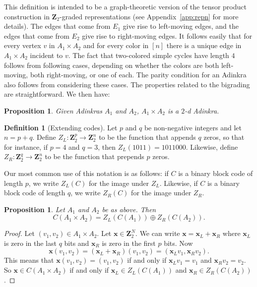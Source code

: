 \documentclass[12pt,twoside,singlespace]{article}
\numberwithin{equation}{section}
\newtheorem{prop}[equation]{Proposition}
\theoremstyle{definition}
\newtheorem{definition}[equation]{Definition}
\newcommand{\ZZ}{\mathbf{Z}}
\renewcommand{\vec}[1]{\mathbf{#1}}
\begin{document}
This definition is intended to be a graph-theoretic version of the tensor product construction in $\ZZ_2$-graded representations (see Appendix~\ref{app:repn} for more details).  The edges that come from $E_1$ give rise to left-moving edges, and the edges that come from $E_2$ give rise to right-moving edges.  It follows easily that for every vertex $v$ in $A_1\times A_2$ and for every color in $[n]$ there is a unique edge in $A_1\times A_2$ incident to $v$.  The fact that two-colored simple cycles have length $4$ follows from following cases, depending on whether the colors are both left-moving, both right-moving, or one of each.  The parity condition for an Adinkra also follows from considering these cases.  The properties related to the bigrading are straightforward.  We then have:

\begin{prop}
\label{prop:product-admissible}
Given Adinkras $A_1$ and $A_2$, $A_1\times A_2$ is a $2$-d Adinkra.
\end{prop}


\begin{definition}[Extending codes]
Let $p$ and $q$ be non-negative integers and let $n=p+q$.  Define $Z_L:\ZZ_2^p\to\ZZ_2^n$ to be the function that appends $q$ zeros, so that for instance, if $p=4$ and $q=3$, then $Z_L(1011)=1011000$.  Likewise, define $Z_R:\ZZ_2^q\to\ZZ_2^n$ to be the function that prepends $p$ zeros.

Our most common use of this notation is as follows: if $C$ is a binary block code of length $p$, we write $Z_L(C)$ for the image under $Z_L$.  Likewise, if $C$ is a binary block code of length $q$, we write $Z_R(C)$ for the image under $Z_R$.
\end{definition}

\begin{prop}
\label{prop:prodcode}
Let $A_1$ and $A_2$ be as above.  Then
\[C(A_1\times A_2)=Z_L(C(A_1))\oplus Z_R(C(A_2)).\]
\end{prop}
\begin{proof}
Let $(v_1,v_2)\in A_1\times A_2$.  Let $\vec{x}\in \ZZ_2^N$.  We can write $\vec{x}=\vec{x}_L+\vec{x}_R$ where $\vec{x}_L$ is zero in the last $q$ bits and $\vec{x}_R$ is zero in the first $p$ bits.  Now
\[\vec{x}(v_1,v_2)=(\vec{x}_L+\vec{x}_R)(v_1,v_2)=(\vec{x}_Lv_1,\vec{x}_Rv_2).\]
This means that $\vec{x}(v_1,v_2)=(v_1,v_2)$ if and only if $\vec{x}_Lv_1=v_1$ and $\vec{x}_R v_2=v_2$. So $\vec{x}\in C(A_1\times A_2)$ if and only if $\vec{x}_L\in Z_L(C(A_1))$ and $\vec{x}_R\in Z_R(C(A_2))$.
\end{proof}
\end{document}
